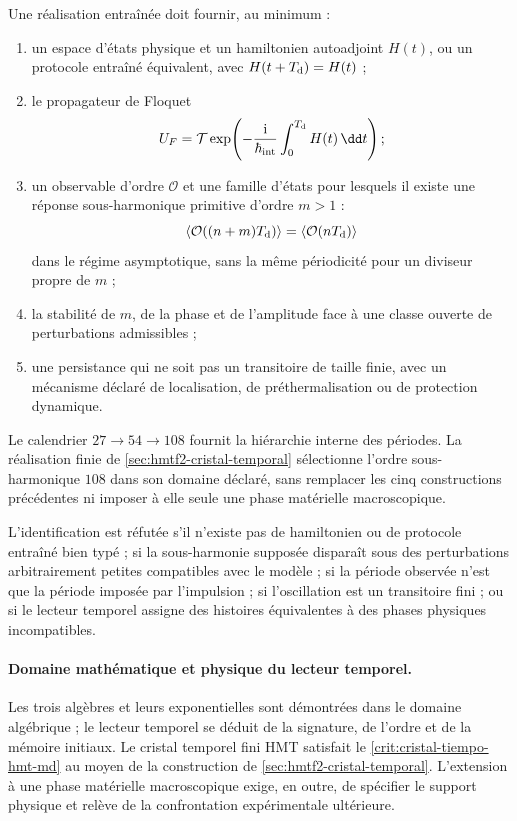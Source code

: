 Une réalisation entraînée doit fournir, au minimum :
\begin{enumerate}
 \item un espace d'états physique et un hamiltonien autoadjoint
 \(H(t)\), ou un protocole entraîné équivalent, avec
 \(H(t+T_{\rm d})=H(t)\) ;
 \item le propagateur de Floquet
 \[
  U_F=\mathcal T\exp\!\left(
  -\frac{\mathrm i}{\hbar_{\rm int}}
  \int_0^{T_{\rm d}}H(t)\,\dd t\right);
 \]
 \item un observable d'ordre \(\mathcal O\) et une famille d'états pour
 lesquels il existe une réponse sous-harmonique primitive d'ordre \(m>1\) :
 \[
  \langle\mathcal O((n+m)T_{\rm d})\rangle
  =\langle\mathcal O(nT_{\rm d})\rangle
 \]
 dans le régime asymptotique, sans la même périodicité pour un diviseur propre
 de \(m\) ;
 \item la stabilité de \(m\), de la phase et de l'amplitude face à une classe
 ouverte de perturbations admissibles ;
 \item une persistance qui ne soit pas un transitoire de taille finie, avec un
 mécanisme déclaré de localisation, de préthermalisation ou de protection
 dynamique.
\end{enumerate}
Le calendrier \(27\to54\to108\) fournit la hiérarchie interne des périodes.
La réalisation finie de \cref{sec:hmtf2-cristal-temporal} sélectionne l'ordre
sous-harmonique \(108\) dans son domaine déclaré, sans remplacer les cinq
constructions précédentes ni imposer à elle seule une phase matérielle
macroscopique.

\begin{criterion}
\label{crit:cristal-tiempo-hmt-md}
L'identification est réfutée s'il n'existe pas de hamiltonien ou de protocole
entraîné bien typé ; si la sous-harmonie supposée disparaît sous des
perturbations arbitrairement petites compatibles avec le modèle ; si la
période observée n'est que la période imposée par l'impulsion ; si
l'oscillation est un transitoire fini ; ou si le lecteur temporel assigne des histoires
équivalentes à des phases physiques incompatibles.
\end{criterion}

\paragraph{Domaine mathématique et physique du lecteur temporel.}
Les trois algèbres et leurs exponentielles sont démontrées dans le domaine algébrique ;
le lecteur temporel se déduit de la signature, de l'ordre et de la mémoire initiaux. Le
cristal temporel fini HMT satisfait le
\cref{crit:cristal-tiempo-hmt-md} au moyen de la construction de
\cref{sec:hmtf2-cristal-temporal}. L'extension à une phase matérielle
macroscopique exige, en outre, de spécifier le support physique et relève de la
confrontation expérimentale ultérieure.
